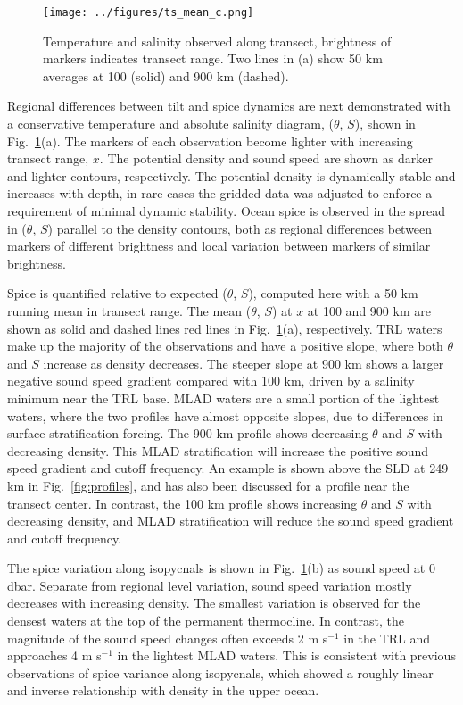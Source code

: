 \documentclass[preprint,NumberedRefs]{JASA}
\begin{document}
\begin{figure}
\texttt{[image: ../figures/ts\_mean\_c.png]}
    \caption{\label{fig:ts_diagram}{Temperature and salinity observed along transect, brightness of markers indicates transect range. Two lines in (a) show 50 km averages at 100 (solid) and 900 km (dashed).}}
\end{figure}
Regional differences between tilt and spice dynamics are next demonstrated with a conservative temperature and absolute salinity diagram,\cite{TEOS10} ($\theta$, $S$), shown in Fig.~\ref{fig:ts_diagram}(a). The markers of each observation become lighter with increasing transect range, $x$. The potential density and sound speed are shown as darker and lighter contours, respectively. The potential density is dynamically stable and increases with depth, in rare cases the gridded data was adjusted to enforce a requirement of minimal dynamic stability.\citep{barker2017stabilizing} Ocean spice is observed in the spread in ($\theta$, $S$) parallel to the density contours, both as regional differences between markers of different brightness and local variation between markers of similar brightness.

Spice is quantified relative to expected ($\theta$, $S$), computed here with a 50 km running mean in transect range. The mean ($\theta$, $S$) at $x$ at 100 and 900 km are shown as solid and dashed lines red lines in Fig.~\ref{fig:ts_diagram}(a), respectively. TRL waters make up the majority of the observations and have a positive slope, where both $\theta$ and $S$ increase as density decreases. The steeper slope at 900 km shows a larger negative sound speed gradient compared with 100 km, driven by a salinity minimum near the TRL base. MLAD waters are a small portion of the lightest waters, where the two profiles have almost opposite slopes, due to differences in surface stratification forcing.\cite{colosi2020observations} The 900 km profile shows decreasing $\theta$ and $S$ with decreasing density. This MLAD stratification will increase the positive sound speed gradient and cutoff frequency. An example is shown above the SLD at 249 km in Fig.~\ref{fig:profiles}, and has also been discussed for a profile near the transect center.\cite{colosi2020observations} In contrast, the 100 km profile shows increasing $\theta$ and $S$ with decreasing density, and MLAD stratification will reduce the sound speed gradient and cutoff frequency.

The spice variation along isopycnals is shown in Fig.~\ref{fig:ts_diagram}(b) as sound speed at 0 dbar. Separate from regional level variation, sound speed variation mostly decreases with increasing density. The smallest variation is observed for the densest waters at the top of the permanent thermocline.\cite{cole2010seasonal} In contrast, the magnitude of the sound speed changes often exceeds 2 m s$^{-1}$ in the TRL and approaches 4 m s$^{-1}$ in the lightest MLAD waters. This is consistent with previous observations of spice variance along isopycnals, which showed a roughly linear and inverse relationship with density in the upper ocean.\cite{ferrari2000}
\end{document}
